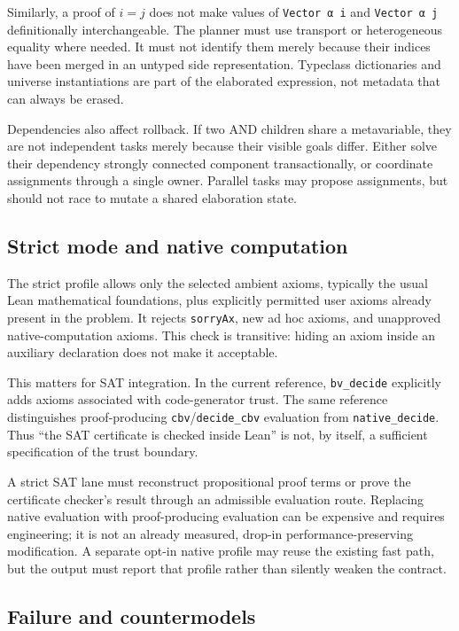 \documentclass[11pt,a4paper]{article}
\begin{document}
Similarly, a proof of $i=j$ does not make values of \texttt{Vector α i} and \texttt{Vector α j} definitionally interchangeable. The planner must use transport or heterogeneous equality where needed. It must not identify them merely because their indices have been merged in an untyped side representation. Typeclass dictionaries and universe instantiations are part of the elaborated expression, not metadata that can always be erased.

Dependencies also affect rollback. If two AND children share a metavariable, they are not independent tasks merely because their visible goals differ. Either solve their dependency strongly connected component transactionally, or coordinate assignments through a single owner. Parallel tasks may propose assignments, but should not race to mutate a shared elaboration state.

\subsection{Strict mode and native computation}

The strict profile allows only the selected ambient axioms, typically the usual Lean mathematical foundations, plus explicitly permitted user axioms already present in the problem. It rejects \texttt{sorryAx}, new ad hoc axioms, and unapproved native-computation axioms. This check is transitive: hiding an axiom inside an auxiliary declaration does not make it acceptable.

This matters for SAT integration. In the current reference, \texttt{bv\_decide} explicitly adds axioms associated with code-generator trust. The same reference distinguishes proof-producing \texttt{cbv}/\texttt{decide\_cbv} evaluation from \texttt{native\_decide}. Thus ``the SAT certificate is checked inside Lean'' is not, by itself, a sufficient specification of the trust boundary.\cite{tactic-reference}

A strict SAT lane must reconstruct propositional proof terms or prove the certificate checker's result through an admissible evaluation route. Replacing native evaluation with proof-producing evaluation can be expensive and requires engineering; it is not an already measured, drop-in performance-preserving modification. A separate opt-in native profile may reuse the existing fast path, but the output must report that profile rather than silently weaken the contract.

\subsection{Failure and countermodels}
\end{document}
